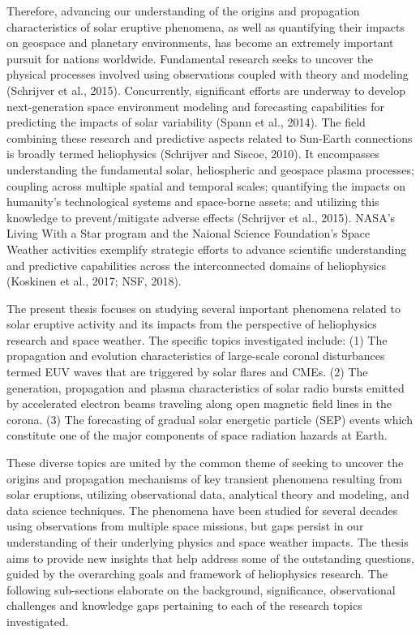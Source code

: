 Therefore, advancing our understanding of the origins and propagation characteristics of solar eruptive phenomena, as well as quantifying their impacts on geospace and planetary environments, has become an extremely important pursuit for nations worldwide. Fundamental research seeks to uncover the physical processes involved using observations coupled with theory and modeling (Schrijver et al., 2015). Concurrently, significant efforts are underway to develop next-generation space environment modeling and forecasting capabilities for predicting the impacts of solar variability (Spann et al., 2014). The field combining these research and predictive aspects related to Sun-Earth connections is broadly termed heliophysics (Schrijver and Siscoe, 2010). It encompasses understanding the fundamental solar, heliospheric and geospace plasma processes; coupling across multiple spatial and temporal scales; quantifying the impacts on humanity's technological systems and space-borne assets; and utilizing this knowledge to prevent/mitigate adverse effects (Schrijver et al., 2015). NASA's Living With a Star program and the Naional Science Foundation's Space Weather activities exemplify strategic efforts to advance scientific understanding and predictive capabilities across the interconnected domains of heliophysics (Koskinen et al., 2017; NSF, 2018).

The present thesis focuses on studying several important phenomena related to solar eruptive activity and its impacts from the perspective of heliophysics research and space weather. The specific topics investigated include: (1) The propagation and evolution characteristics of large-scale coronal disturbances termed EUV waves that are triggered by solar flares and CMEs. (2) The generation, propagation and plasma characteristics of solar radio bursts emitted by accelerated electron beams traveling along open magnetic field lines in the corona. (3) The forecasting of gradual solar energetic particle (SEP) events which constitute one of the major components of space radiation hazards at Earth.

These diverse topics are united by the common theme of seeking to uncover the origins and propagation mechanisms of key transient phenomena resulting from solar eruptions, utilizing observational data, analytical theory and modeling, and data science techniques. The phenomena have been studied for several decades using observations from multiple space missions, but gaps persist in our understanding of their underlying physics and space weather impacts. The thesis aims to provide new insights that help address some of the outstanding questions, guided by the overarching goals and framework of heliophysics research. The following sub-sections elaborate on the background, significance, observational challenges and knowledge gaps pertaining to each of the research topics investigated.

